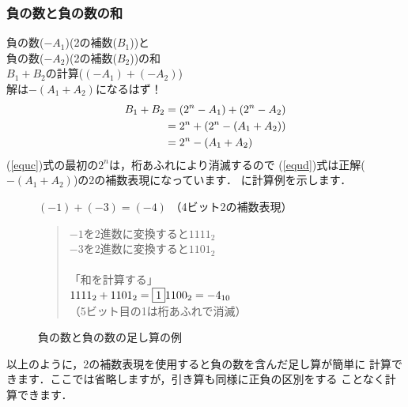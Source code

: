 \subsubsection{負の数と負の数の和}
負の数($-A_1$)(2の補数($B_1$))と\\
負の数($-A_2$)(2の補数($B_2$))の和\\
$B_1 + B_2$の計算($(-A_1) + (-A_2)$)\\
解は$-(A_1 + A_2)$になるはず！
{\small\begin{align}
B_1 + B_2 &= (2^n - A_1) + (2^n - A_2) \notag \\
          &= 2^n + (2^n - (A_1 + A_2)) \label{equc} \\
          &= 2^n - (A_1 + A_2)         \label{equd}
\end{align}}
(\ref{equc})式の最初の$2^n$は，桁あふれにより消滅するので
(\ref{equd})式は正解($-(A_1 + A_2)$)の2の補数表現になっています．
に計算例を示します．

\begin{figure}[tbp]
\begin{center}
\parbox{0.9\columnwidth}{\small
$(-1)+(-3)=(-4)$ （4ビット2の補数表現） \\
\begin{quote}
$-1$を2進数に変換すると$1111_2$ \\
$-3$を2進数に変換すると$1101_2$ \\
\\
「和を計算する」 \\
$1111_2 + 1101_2 = \fbox{1}1100_2 =  -4_{10}$ \\
（5ビット目の1は桁あふれで消滅） 
\end{quote}}
\caption{負の数と負の数の足し算の例}
\label{fig:chap2:addex3}
\end{center}
\end{figure}

以上のように，2の補数表現を使用すると負の数を含んだ足し算が簡単に
計算できます．ここでは省略しますが，引き算も同様に正負の区別をする
ことなく計算できます．

